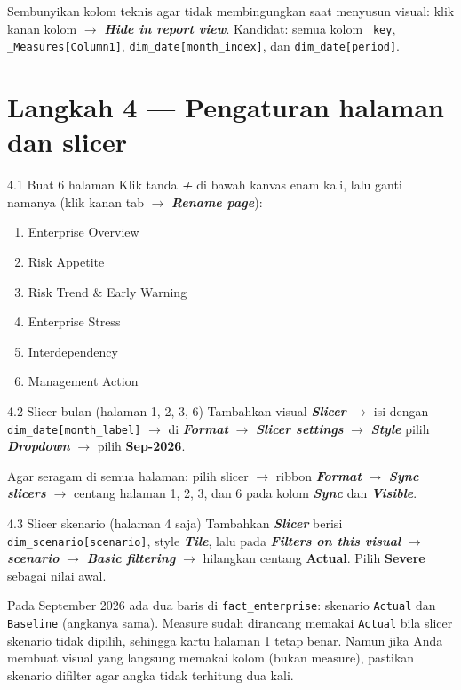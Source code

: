 \documentclass[11pt,a4paper]{article}
\newcommand{\file}[1]{\texttt{\small #1}}
\newcommand{\ui}[1]{\textbf{\textit{#1}}}
\begin{document}
\begin{tipbox}
Sembunyikan kolom teknis agar tidak membingungkan saat menyusun visual: klik kanan kolom $\rightarrow$ \ui{Hide in report view}. Kandidat: semua kolom \file{*\_key}, \file{\_Measures[Column1]}, \file{dim\_date[month\_index]}, dan \file{dim\_date[period]}.
\end{tipbox}

\section{Langkah 4 --- Pengaturan halaman dan slicer}

\begin{stepbox}{4.1 Buat 6 halaman}
Klik tanda \ui{+} di bawah kanvas enam kali, lalu ganti namanya (klik kanan tab $\rightarrow$ \ui{Rename page}):
\begin{enumerate}
\item Enterprise Overview
\item Risk Appetite
\item Risk Trend \& Early Warning
\item Enterprise Stress
\item Interdependency
\item Management Action
\end{enumerate}
\end{stepbox}

\begin{stepbox}{4.2 Slicer bulan (halaman 1, 2, 3, 6)}
Tambahkan visual \ui{Slicer} $\rightarrow$ isi dengan \file{dim\_date[month\_label]} $\rightarrow$ di \ui{Format} $\rightarrow$ \ui{Slicer settings} $\rightarrow$ \ui{Style} pilih \ui{Dropdown} $\rightarrow$ pilih \textbf{Sep-2026}.

Agar seragam di semua halaman: pilih slicer $\rightarrow$ ribbon \ui{Format} $\rightarrow$ \ui{Sync slicers} $\rightarrow$ centang halaman 1, 2, 3, dan 6 pada kolom \ui{Sync} dan \ui{Visible}.
\end{stepbox}

\begin{stepbox}{4.3 Slicer skenario (halaman 4 saja)}
Tambahkan \ui{Slicer} berisi \file{dim\_scenario[scenario]}, style \ui{Tile}, lalu pada \ui{Filters on this visual} $\rightarrow$ \ui{scenario} $\rightarrow$ \ui{Basic filtering} $\rightarrow$ hilangkan centang \textbf{Actual}. Pilih \textbf{Severe} sebagai nilai awal.
\end{stepbox}

\begin{warnbox}
Pada September 2026 ada dua baris di \file{fact\_enterprise}: skenario \texttt{Actual} dan \texttt{Baseline} (angkanya sama). Measure sudah dirancang memakai \texttt{Actual} bila slicer skenario tidak dipilih, sehingga kartu halaman 1 tetap benar. Namun jika Anda membuat visual yang langsung memakai kolom (bukan measure), pastikan skenario difilter agar angka tidak terhitung dua kali.
\end{warnbox}
\end{document}
